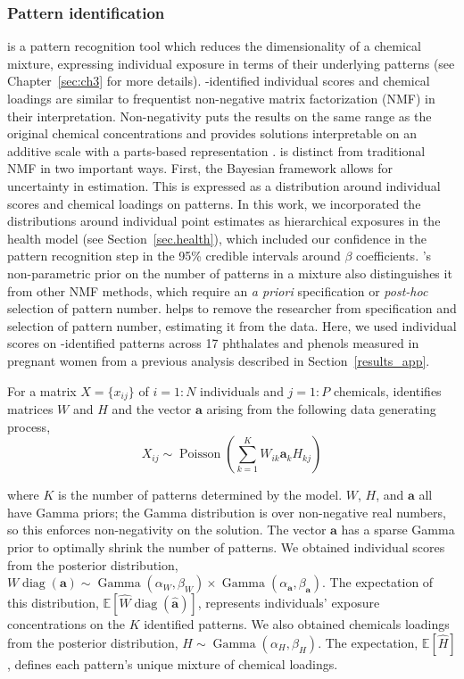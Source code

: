 \subsubsection{Pattern identification}
\label{sec.patterns}
\bnmf is a pattern recognition tool which reduces the dimensionality of a chemical mixture, expressing individual exposure in terms of their underlying patterns (see Chapter~\ref{sec:ch3} for more details). \bnmfc-identified individual scores and chemical loadings are similar to frequentist non-negative matrix factorization (NMF) in their interpretation. Non-negativity puts the results on the same range as the original chemical concentrations and provides solutions interpretable on an additive scale with a parts-based representation \cite{holtzman2018machine, lee1999learning}. \bnmf is distinct from traditional NMF in two important ways. First, the Bayesian framework allows for uncertainty in estimation. This is expressed as a distribution around individual scores and chemical loadings on patterns. In this work, we incorporated the distributions around individual point estimates as hierarchical exposures in the health model (see Section~\ref{sec.health}), which included our confidence in the pattern recognition step in the 95\% credible intervals around $\beta$ coefficients. \bnmfc's non-parametric prior on the number of patterns in a mixture also distinguishes it from other NMF methods, which require an \textit{a priori} specification or \textit{post-hoc} selection of pattern number. \bnmf helps to remove the researcher from specification and selection of pattern number, estimating it from the data. Here, we used individual scores on \bnmfc-identified patterns across 17 phthalates and phenols measured in pregnant women from a previous analysis described in Section~\ref{results_app}.

For a matrix $X =\lbrace x_{i j}\rbrace $ of $i = 1:N$ individuals and $j = 1:P$ chemicals, \bnmf identifies matrices $W$ and $H$ and the vector $\mathbf{a}$ arising from the following data generating process,
\begin{equation}
\label{nmf}
X_{i j} \sim \operatorname{Poisson}\left(\sum^K_{k=1} W_{i k} \mathbf{a}_k H_{k j}\right)
\end{equation} 

\noindent where $K$ is the number of patterns determined by the model. $W$, $H$, and $\mathbf{a}$ all have Gamma priors; the Gamma distribution is over non-negative real numbers, so this enforces non-negativity on the solution. The vector $\mathbf{a}$ has a sparse Gamma prior to optimally shrink the number of patterns. We obtained individual scores from the posterior distribution, ${W\operatorname{diag}(\mathbf{a}) \sim \operatorname{Gamma}(\alpha_W, \beta_W)} \times
\operatorname{Gamma}(\alpha_\mathbf{a}, \beta_\mathbf{a})$. The expectation of this distribution, $\mathbb{E}[\widehat{W}\operatorname{diag}(\widehat{\mathbf{a}})]$, represents individuals' exposure concentrations on the $K$ identified patterns. We also obtained chemicals loadings from the posterior distribution, $H \sim \operatorname{Gamma}(\alpha_H, \beta_H)$. The expectation, $\mathbb{E}[\widehat{H}]$, defines each pattern's unique mixture of chemical loadings.

